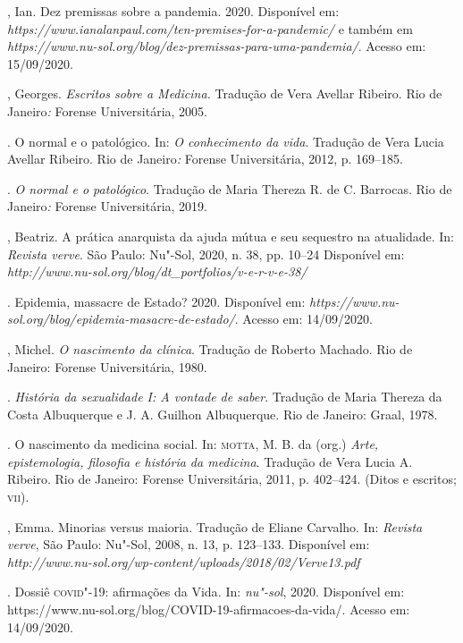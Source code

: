 \begin{bibliohedra}
, Ian. Dez premissas sobre a pandemia. 2020. Disponível em:
\emph{https://www.ianalanpaul.com/ten-premises-for-a-pandemic/} e também
em \emph{https://www.nu-sol.org/blog/dez-premissas-para-uma-pandemia/}.
Acesso em: 15/09/2020.

, Georges. \emph{Escritos sobre a Medicina.} Tradução de Vera
Avellar Ribeiro. Rio de Janeiro\emph{:} Forense Universitária, 2005.

\titidem. O normal e o patológico. In: \emph{O conhecimento da vida}.
Tradução de Vera Lucia Avellar Ribeiro. Rio de Janeiro\emph{:} Forense
Universitária, 2012, p. 169--185.

\titidem. \emph{O normal e o patológico}. Tradução de Maria Thereza R.
de C. Barrocas. Rio de Janeiro\emph{:} Forense Universitária, 2019.

, Beatriz. A prática anarquista da ajuda mútua e seu sequestro
na atualidade. In: \emph{Revista verve}. São Paulo: Nu"-Sol, 2020, n. 38,
pp. 10--24 Disponível em:
\emph{http://www.nu-sol.org/blog/dt\_portfolios/v-e-r-v-e-38/}

. Epidemia, massacre de Estado? 2020.
Disponível em:
\emph{https://www.nu-sol.org/blog/epidemia-masacre-de-estado/}. Acesso
em: 14/09/2020.

, Michel. \emph{O nascimento da clínica}. Tradução de Roberto
Machado. Rio de Janeiro: Forense Universitária, 1980.

\titidem. \emph{História da sexualidade I: A vontade de saber}. Tradução
de Maria Thereza da Costa Albuquerque e J. A. Guilhon Albuquerque. Rio
de Janeiro: Graal, 1978.

\titidem. O nascimento da medicina social. In: \textsc{motta}, M. B. da (org.)
\emph{Arte, epistemologia, filosofia e história da medicina}. Tradução
de Vera Lucia A. Ribeiro. Rio de Janeiro: Forense Universitária, 2011,
p. 402--424. (Ditos e escritos; \textsc{vii}).

, Emma. Minorias versus maioria. Tradução de Eliane Carvalho. In:
\emph{Revista verve}, São Paulo: Nu"-Sol, 2008, n. 13, p. 123--133.
Disponível em:
\emph{http://www.nu-sol.org/wp-content/uploads/2018/02/Verve13.pdf}

. Dossiê \textsc{covid}"-19: afirmações da Vida\emph{.} In: \emph{nu"-sol},
2020. Disponível em:
https://www.nu-sol.org/blog/COVID-19-afirmacoes-da-vida/. Acesso em: 14/09/2020.


\end{bibliohedra}
